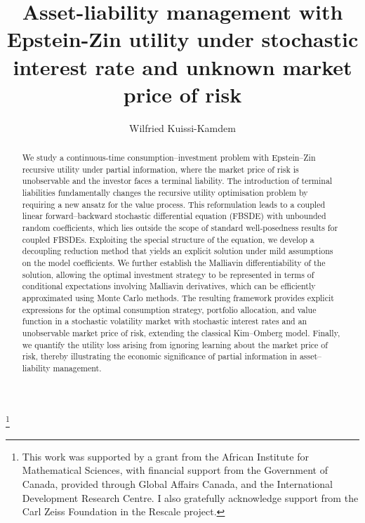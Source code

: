 \documentclass[12,reqno]{amsart}
\numberwithin{equation}{section}
\begin{document}
	
	
	\title[ ALM with Epstein-Zin recursive utility under partial information]{Asset-liability management with Epstein-Zin utility under stochastic interest rate and unknown market price of risk}
	\author[W. Kuissi-Kamdem]{Wilfried Kuissi-Kamdem}
	\address{African Institute for Mathematical Sciences, Ghana}
	\address{Department of Mathematics, University of Rwanda, Rwanda}
	\address{Department of Mathematical Stochastics, University of Freiburg, Germany}
	\thanks{This work was supported by a grant from the African Institute for Mathematical Sciences, with financial support from the Government of Canada, provided through Global Affairs Canada, and the International Development Research Centre. I also gratefully acknowledge support from the Carl Zeiss Foundation in the Rescale project.}
	
	\date{}
	
	
	
	\maketitle
	
	\begin{abstract}
		We study a continuous-time consumption--investment problem with Epstein--Zin recursive utility under partial information, where the market price of risk is unobservable and the investor faces a terminal liability. The introduction of terminal liabilities fundamentally changes the recursive utility optimisation problem by requiring a new ansatz for the value process. This reformulation leads to a coupled linear forward--backward stochastic differential equation (FBSDE) with unbounded random coefficients, which lies outside the scope of standard well-posedness results for coupled FBSDEs. Exploiting the special structure of the equation, we develop a decoupling reduction method that yields an explicit solution under mild assumptions on the model coefficients. We further establish the Malliavin differentiability of the solution, allowing the optimal investment strategy to be represented in terms of conditional expectations involving Malliavin derivatives, which can be efficiently approximated using Monte Carlo methods. The resulting framework provides explicit expressions for the optimal consumption strategy, portfolio allocation, and value function in a stochastic volatility market with stochastic interest rates and an unobservable market price of risk, extending the classical Kim--Omberg model. Finally, we quantify the utility loss arising from ignoring learning about the market price of risk, thereby illustrating the economic significance of partial information in asset--liability management.
	\end{abstract}
\end{document}
